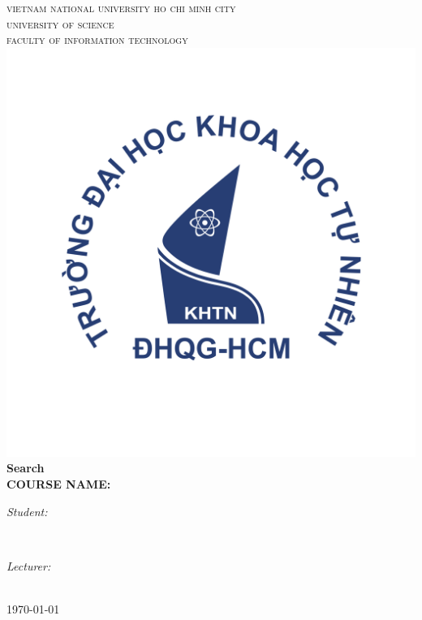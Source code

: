 \begin{titlepage}
\newcommand{\HRule}{\rule{\linewidth}{0.5mm}}
\centering

\textsc{\LARGE vietnam national university ho chi minh city}\\[0.2cm]
\textsc{\LARGE university of science}\\[0.3cm]
\textsc{\Large faculty of information technology}\\[0.5cm]

\includegraphics[scale=.35]{content/hcmus-logo.png}\\[0.5cm]

\huge{\bfseries{Search}}\\
\textbf{\large COURSE NAME: \coursetitle}\\[0.5cm]

\begin{minipage}[t]{0.45\textwidth}
\begin{flushleft} \large
\emph{Student:}\\
\studentname
\end{flushleft}
\end{minipage}
~
\begin{minipage}[t]{0.45\textwidth}
\begin{flushright} \large
\emph{Lecturer:} \\
\teachername
\end{flushright}
\end{minipage}\\[5cm]

{\large \today}\\[2cm]


\vfill
\end{titlepage}
	